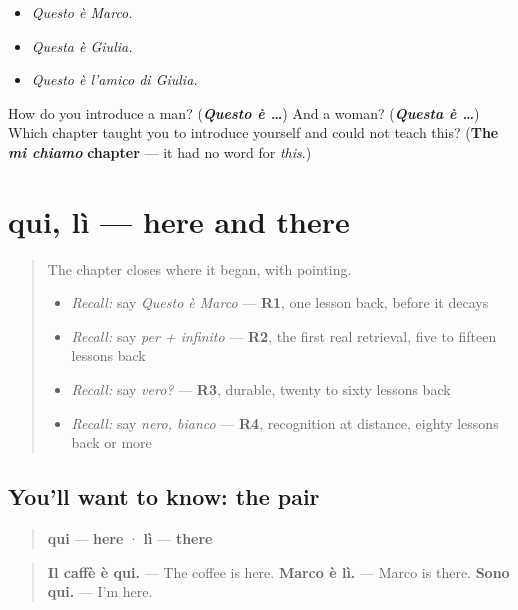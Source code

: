 \begin{itemize}
\raggedright
  \item \emph{Questo è Marco.}
  \item \emph{Questa è Giulia.}
  \item \emph{Questo è l'amico di Giulia.}
\end{itemize}

\begin{tcolorbox}[breakable,colback=teal!4,colframe=teal!35!black,title={Before you move on}]
How do you introduce a man? (\emph{\textbf{Questo è …}}) And a woman? (\emph{\textbf{Questa è …}}) Which chapter taught you to introduce yourself and could not teach this? (\textbf{The} \emph{\textbf{mi chiamo}} \textbf{chapter} — it had no word for \emph{this}.)
\end{tcolorbox}
\section[qui / lì]{qui, lì — here and there}

\label{lesson:IT-C33-qui-li}



\begin{quote}
The chapter closes where it began, with pointing.

\begin{itemize}
\raggedright
  \item \emph{Recall:} say \emph{Questo è Marco} — \textbf{R1}, one lesson back, before it decays
  \item \emph{Recall:} say \emph{per + infinito} — \textbf{R2}, the first real retrieval, five to fifteen lessons back
  \item \emph{Recall:} say \emph{vero?} — \textbf{R3}, durable, twenty to sixty lessons back
  \item \emph{Recall:} say \emph{nero, bianco} — \textbf{R4}, recognition at distance, eighty lessons back or more
\end{itemize}
\end{quote}

\subsection*{You'll want to know: the pair}
\begin{quote}
\textbf{qui} — \textbf{here} · \textbf{lì} — \textbf{there}
\end{quote}

\begin{quote}
\textbf{Il caffè è qui.} — The coffee is here. \textbf{Marco è lì.} — Marco is there. \textbf{Sono qui.} — I'm here.
\end{quote}

